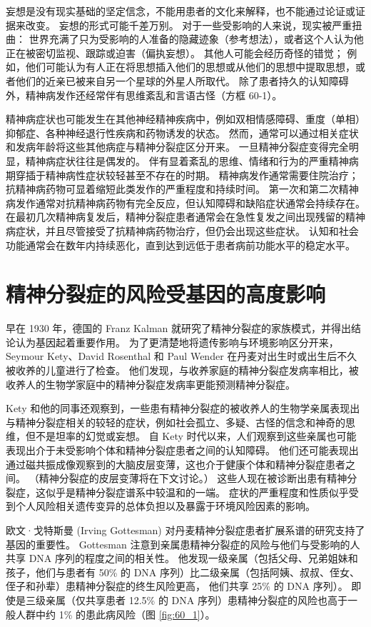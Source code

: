 妄想是没有现实基础的坚定信念，不能用患者的文化来解释，也不能通过论证或证据来改变。
妄想的形式可能千差万别。 对于一些受影响的人来说，现实被严重扭曲：
世界充满了只为受影响的人准备的隐藏迹象（参考想法），或者这个人认为他正在被密切监视、跟踪或迫害（偏执妄想）。
其他人可能会经历奇怪的错觉；
例如，他们可能认为有人正在将思想插入他们的思想或从他们的思想中提取思想，或者他们的近亲已被来自另一个星球的外星人所取代。
除了患者持久的认知障碍外，精神病发作还经常伴有思维紊乱和言语古怪（方框 60-1）。


精神病症状也可能发生在其他神经精神疾病中，例如双相情感障碍、重度（单相）抑郁症、各种神经退行性疾病和药物诱发的状态。
然而，通常可以通过相关症状和发病年龄将这些其他病症与精神分裂症区分开来。
一旦精神分裂症变得完全明显，精神病症状往往是偶发的。
伴有显着紊乱的思维、情绪和行为的严重精神病期穿插于精神病性症状较轻甚至不存在的时期。
精神病发作通常需要住院治疗；
抗精神病药物可显着缩短此类发作的严重程度和持续时间。
第一次和第二次精神病发作通常对抗精神病药物有完全反应，但认知障碍和缺陷症状通常会持续存在。
在最初几次精神病复发后，精神分裂症患者通常会在急性复发之间出现残留的精神病症状，并且尽管接受了抗精神病药物治疗，但仍会出现这些症状。
认知和社会功能通常会在数年内持续恶化，直到达到远低于患者病前功能水平的稳定水平。



\section{精神分裂症的风险受基因的高度影响}

早在 1930 年，德国的 Franz Kalman 就研究了精神分裂症的家族模式，并得出结论认为基因起着重要作用。
为了更清楚地将遗传影响与环境影响区分开来，Seymour Kety、David Rosenthal 和 Paul Wender 在丹麦对出生时或出生后不久被收养的儿童进行了检查。
他们发现，与收养家庭的精神分裂症发病率相比，被收养人的生物学家庭中的精神分裂症发病率更能预测精神分裂症。


Kety 和他的同事还观察到，一些患有精神分裂症的被收养人的生物学亲属表现出与精神分裂症相关的较轻的症状，例如社会孤立、多疑、古怪的信念和神奇的思维，但不是坦率的幻觉或妄想。
自 Kety 时代以来，人们观察到这些亲属也可能表现出介于未受影响个体和精神分裂症患者之间的认知障碍。
他们还可能表现出通过磁共振成像观察到的大脑皮层变薄，这也介于健康个体和精神分裂症患者之间。 
（精神分裂症的皮层变薄将在下文讨论。）
这些人现在被诊断出患有精神分裂症，这似乎是精神分裂症谱系中较温和的一端。
症状的严重程度和性质似乎受到个人风险相关遗传变异的总体负担以及暴露于环境风险因素的影响。


欧文·戈特斯曼 (Irving Gottesman) 对丹麦精神分裂症患者扩展系谱的研究支持了基因的重要性。
Gottesman 注意到亲属患精神分裂症的风险与他们与受影响的人共享 DNA 序列的程度之间的相关性。
他发现一级亲属（包括父母、兄弟姐妹和孩子，他们与患者有 50\% 的 DNA 序列）比二级亲属（包括阿姨、叔叔、侄女、侄子和孙辈）患精神分裂症的终生风险更高， 他们共享 25\% 的 DNA 序列）。
即使是三级亲属（仅共享患者 12.5\% 的 DNA 序列）患精神分裂症的风险也高于一般人群中约 1\% 的患此病风险（图 \ref{fig:60_1}）。


